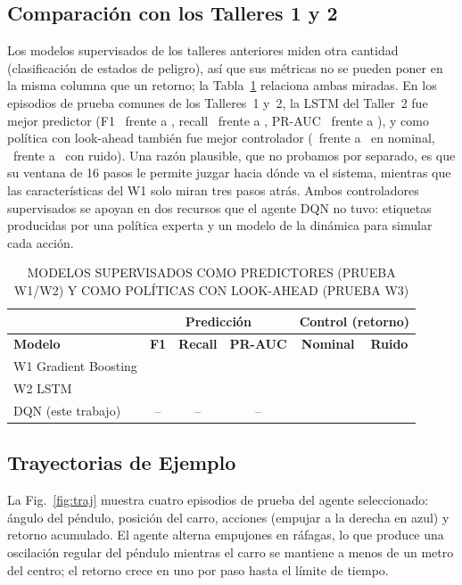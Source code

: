 \documentclass[conference]{IEEEtran}
\begin{document}
\subsection{Comparación con los Talleres 1 y 2}
Los modelos supervisados de los talleres anteriores miden otra cantidad (clasificación de
estados de peligro), así que sus métricas no se pueden poner en la misma columna que un
retorno; la Tabla~\ref{tab:w12} relaciona ambas miradas. En los episodios de prueba comunes
de los Talleres~1 y~2, la LSTM del Taller~2 fue mejor predictor (F1 \WTwoFOne\ frente a
\WOneFOne, recall \WTwoRecall\ frente a \WOneRecall, PR-AUC \WTwoPRAUC\ frente a
\WOnePRAUC), y como política con look-ahead también fue mejor controlador (\TestWTwoMean\
frente a \TestWOneMean\ en nominal, \NoisyWTwoMean\ frente a \NoisyWOneMean\ con ruido).
Una razón plausible, que no probamos por separado, es que su ventana de 16 pasos le permite
juzgar hacia dónde va el sistema, mientras que las características del W1 solo miran tres
pasos atrás. Ambos controladores supervisados se apoyan en dos recursos que el agente DQN no
tuvo: etiquetas producidas por una política experta y un modelo de la dinámica para simular
cada acción.

\begin{table}[t]
\caption{MODELOS SUPERVISADOS COMO PREDICTORES (PRUEBA W1/W2) Y COMO POLÍTICAS CON LOOK-AHEAD (PRUEBA W3)}
\label{tab:w12}
\centering
\small
\setlength{\tabcolsep}{2.5pt}
\begin{tabular}{|l|c|c|c||c|c|}
\hline
& \multicolumn{3}{c||}{\textbf{Predicción}} & \multicolumn{2}{c|}{\textbf{Control (retorno)}} \\ \hline
\textbf{Modelo} & \textbf{F1} & \textbf{Recall} & \textbf{PR-AUC} & \textbf{Nominal} & \textbf{Ruido} \\ \hline
W1 Gradient Boosting & \WOneFOne & \WOneRecall & \WOnePRAUC & \TestWOneMean & \NoisyWOneMean \\ \hline
W2 LSTM & \WTwoFOne & \WTwoRecall & \WTwoPRAUC & \TestWTwoMean & \NoisyWTwoMean \\ \hline
DQN (este trabajo) & -- & -- & -- & \TestDQNMean & \NoisyDQNMean \\ \hline
\end{tabular}
\end{table}

\subsection{Trayectorias de Ejemplo}
La Fig.~\ref{fig:traj} muestra cuatro episodios de prueba del agente seleccionado: ángulo del
péndulo, posición del carro, acciones (empujar a la derecha en azul) y retorno acumulado. El
agente alterna empujones en ráfagas, lo que produce una oscilación regular del péndulo
mientras el carro se mantiene a menos de un metro del centro; el retorno crece en uno por
paso hasta el límite de tiempo.
\end{document}

